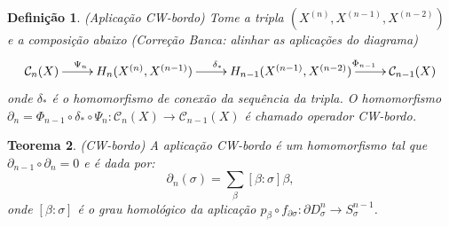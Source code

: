 \documentclass[12pt]{book}
\newtheorem{teorema}{Teorema}[section]
\newtheorem{definicao}[teorema]{Definição}
\newcommand{\celulabordo}[2]{\partial D^{#1}_{#2}}
\newcommand{\homologiarelskele}[3]{H_{#1}(X^{(#2)}, X^{(#3)})}
\newcommand{\homologiarelskelesimpl}[2]{H_{#1}(X^{(#2)}, X^{(#2-1)})}
\newcommand{\skeleton}[1]{X^{(#1)}}
\newcommand{\alerta}[1]{{\color{red}#1}}
\newcommand{\correcaobanca}[1]{\alerta{(Correção Banca: #1)}}
\begin{document}
	\begin{definicao}
		(Aplicação CW-bordo) Tome a tripla $(\skeleton{n}, \skeleton{n-1}, \skeleton{n-2})$ e a composição abaixo
		\correcaobanca{alinhar as aplicações do diagrama}
		\[
		\xymatrix{
			\mathcal{C}_{n}(X) \ar[r]^{\Psi_{n}\qquad} &
			\homologiarelskelesimpl{n}{n} \ar[r]^{\delta_{*}} & 
			\homologiarelskele{n-1}{n-1}{n-2} \ar[r]^{\qquad \Phi_{n-1}}&
			\mathcal{C}_{n-1}(X)
		}
		\]
		onde $\delta_{*}$ é o homomorfismo de conexão da sequência da tripla. O homomorfismo $\partial_{n} = \Phi_{n-1} \circ \delta_{*} \circ \Psi_{n} : \mathcal{C}_{n}(X) \to \mathcal{C}_{n-1}(X)$ é chamado operador CW-bordo.
	\end{definicao}
	
	\begin{teorema}
		(CW-bordo) A aplicação CW-bordo é um homomorfismo tal que $\partial_{n-1}\circ\partial_{n} = 0$ e é dada por:
		$$
		\partial_{n}(\sigma) = \sum_{\beta}[\beta:\sigma]\beta,
		$$
		onde $[\beta:\sigma]$ é o grau homológico da aplicação $p_{\beta} \circ f_{\partial\sigma}:\celulabordo{n}{\sigma} \to S^{n-1}_{\sigma}$.
	\end{teorema}
\end{document}
